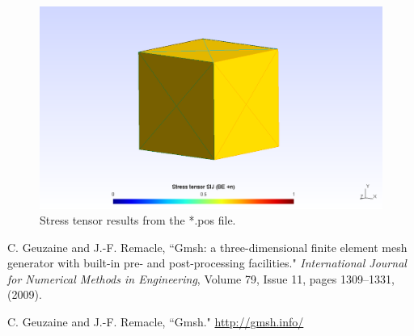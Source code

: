 \documentclass[a4]{article}
\begin{document}
\begin{figure}
	\centering
	\includegraphics[scale = 0.5]{stress.png}
	\caption{Stress tensor results from the *.pos file.}
	\label{fig:stress}
\end{figure}

\FloatBarrier

\begin{thebibliography}{99}
	
	 C. Geuzaine and J.-F. Remacle, ``Gmsh: a three-dimensional finite element mesh generator with built-in pre- and post-processing facilities." \textit{International Journal for Numerical Methods in Engineering}, Volume 79, Issue 11, pages 1309--1331, (2009).
	
	 C. Geuzaine and J.-F. Remacle, ``Gmsh." \url{http://gmsh.info/}
	
\end{thebibliography}
\end{document}
